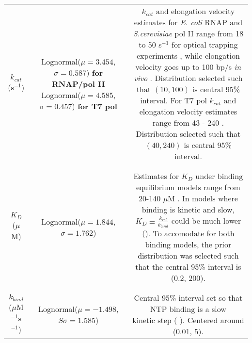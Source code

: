 \documentclass[10pt,letterpaper]{article}
\begin{document}
\begin{table}[!htb]
\begin{adjustwidth}{-2.25in}{0in}
{\begin{tabular}{|ccc|}
$k_{cat}$ (s$^{-1}$) & \makecell{ Lognormal($\mu = 3.454$, $\sigma = 0.587$) \textbf{for RNAP/pol II} \\ Lognormal($\mu = 4.585$, $\sigma = 0.457$) \textbf{for T7 pol} }  & \makecell{
 $k_{cat}$ and elongation velocity estimates for \textit{E. coli} RNAP \\ and {\it S.cerevisiae} pol II range from 18 to 50 s$^{-1}$  for optical \\ trapping  experiments \cite{bai2007mechanochemical, bai2004sequence, mejia2015trigger, galburt2007backtracking, hodges2009nucleosomal}, while elongation velocity goes \\ up to 100 bp/s {\it in vivo} \cite{vogel1994rna, ryals1982temperature, richardson1996control, mason2005distinction}. Distribution selected such \\ that  $(10,100)$ is central 95\% interval. \\ For T7 pol $k_{cat}$ and elongation velocity estimates range \\ from 43 - 240 \cite{skinner2004promoter, iost1992bacteriophage, bonner1994characterization, anand2006transient}. Distribution selected such \\ that $(40,240)$ is central 95\% interval.}\\

&&\\
\hline
&&\\


$K_D$ ($\mu$M) & Lognormal($\mu = 1.844$, $\sigma = 1.762$)
 & \makecell{ Estimates for $K_D$ under binding equilibrium models range \\ from 20-140 $\mu$M \cite{rhodes1974ribonucleic, bai2007mechanochemical, kireeva2008transient, larson2012trigger, thomen2005unravelling}. In models where binding is \\ kinetic and slow, $K_D \equiv \frac{k_{rel}}{k_{bind}}$ could be much lower \\ (\nameref{S4_Appendix}). To accomodate for both binding models, \\ the prior distribution was selected such that the central \\ 95\% interval is (0.2, 200).} \\
&&\\
\hline
&&\\

$k_{bind}$ ($\mu$M$^{-1}$s$^{-1}$) & Lognormal($\mu = -1.498$, $S\sigma = 1.585$) & \makecell{
	Central 95\% interval set so that NTP binding is a slow \\ kinetic step (\nameref{S4_Appendix} ). Centered around (0.01, 5).  }  \\


\end{tabular}}
\end{adjustwidth}
\end{table}
\end{document}
